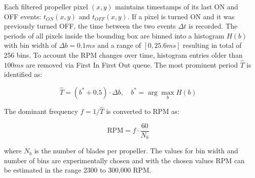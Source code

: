 \documentclass[letterpaper, 10 pt, conference]{ieeeconf}  %
\begin{document}

Each filtered propeller pixel $(x, y)$ maintains timestamps of its last ON and OFF events: $t_{ON}(x, y)$ and $t_{OFF}(x, y)$. If a pixel is turned ON and it was previously turned OFF, the time between the two events $\Delta t$ is recorded. The periods of all pixels inside the bounding box are binned into a histogram $H(b)$ with bin width of $\Delta b = 0.1ms$ and a range of $[0, 25.6ms]$ resulting in total of 256 bins. To account the RPM changes over time, histogram entries older than $100ms$ are removed via First In First Out queue. The most prominent period $\hat{T}$ is identified as:

\begin{equation*}
    \hat{T} = (b^* + 0.5) \cdot \Delta b, \quad b^* = \arg\max_b H(b)
\end{equation*}

The dominant frequency $f = 1/\hat{T}$ is converted to RPM as:

\begin{equation*}
    \text{RPM} = f \cdot \frac{60}{N_b}
\end{equation*}

where $N_b$ is the number of blades per propeller. The values for bin width and number of bins are experimentally chosen and with the chosen values RPM can be estimated in the range 2300 to 300,000 RPM.




\end{document}
